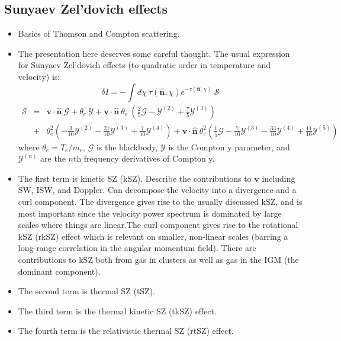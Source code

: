 \documentclass[aps,nofootinbib,groupedaddress]{revtex4}
\begin{document}
\subsection{Sunyaev Zel'dovich effects}

\begin{itemize}
\item Basics of Thomson and Compton scattering.
\item The presentation here deserves some careful thought. The usual expression for Sunyaev Zel'dovich effects (to quadratic order in temperature and velocity) is:
\begin{equation}
\delta I = -\int d\chi \ \dot{\tau}(\mathbf{\hat{n}}, \chi) e^{-\tau (\mathbf{\hat{n}}, \chi)} \ \mathcal{S}
\end{equation}
\begin{eqnarray}
\mathcal{S} &=& \mathbf{v} \cdot \mathbf{\hat{n}} \ \mathcal{G} + \theta_e \ \mathcal{Y} +\mathbf{v} \cdot \mathbf{\hat{n}} \ \theta_e \ \left( \frac{2}{5} \mathcal{G} - \mathcal{Y}^{(2)} + \frac{7}{5} \mathcal{Y}^{(3)} \right)  \\
&+& \theta_e^2 \left( - \frac{3}{10} \mathcal{Y}^{(2)} - \frac{21}{10} \mathcal{Y}^{(3)} + \frac{7}{10} \mathcal{Y}^{(4)} \right) 
+ \mathbf{v} \cdot \mathbf{\hat{n}} \ \theta_e^2 \left( \frac{1}{5} \mathcal{G} - \frac{7}{10} \mathcal{Y}^{(3)} - \frac{33}{10} \mathcal{Y}^{(4)}+ \frac{11}{10} \mathcal{Y}^{(5)} \right)
\end{eqnarray}
where $\theta_e = T_e / m_e$, $\mathcal{G}$ is the blackbody, $\mathcal{Y}$ is the Compton y parameter, and  $\mathcal{Y}^{(n)}$ are the $n$th frequency derivatives of Compton y.
\item The first term is kinetic SZ (kSZ). Describe the contributions to $\mathbf{v}$ including SW, ISW, and Doppler. Can decompose the velocity into a divergence and a curl component. The divergence gives rise to the usually discussed kSZ, and is most important since the velocity power spectrum is dominated by large scales where things are linear.The curl component gives rise to the rotational kSZ (rkSZ) effect which is relevant on smaller, non-linear scales (barring a long-range correlation in the angular momentum field). There are contributions to kSZ both from gas in clusters as well as gas in the IGM (the dominant component).
\item The second term is thermal SZ (tSZ). 
\item The third term is the thermal kinetic SZ (tkSZ) effect. 
\item The fourth term is the relativistic thermal SZ (rtSZ) effect.

\end{itemize}
\end{document}
